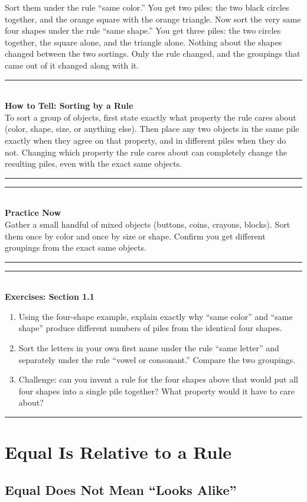 \documentclass[11pt]{book}
\newenvironment{algorithmproc}[1]{\vspace{0.6em}\noindent\rule{\linewidth}{0.6pt}\\[0.2em]\textbf{How to Tell: #1}\\[0.3em]}{\\[0.2em]\noindent\rule{\linewidth}{0.6pt}\vspace{0.6em}}
\newenvironment{practicenow}{\vspace{0.6em}\noindent\rule{\linewidth}{0.6pt}\\[0.2em]\textbf{Practice Now}\\[0.3em]}{\\[0.2em]\noindent\rule{\linewidth}{0.6pt}\vspace{0.6em}}
\newenvironment{exercisebox}[1]{\vspace{0.8em}\noindent\rule{\linewidth}{0.6pt}\\[0.2em]\textbf{Exercises: #1}\\[0.3em]\begin{enumerate}[label=\arabic*., itemsep=0.4em]}{\end{enumerate}\noindent\rule{\linewidth}{0.6pt}\vspace{0.6em}}
\begin{document}
Sort them under the rule ``same color.'' You get two piles: the two black circles together, and the orange square with the orange triangle. Now sort the very same four shapes under the rule ``same shape.'' You get three piles: the two circles together, the square alone, and the triangle alone. Nothing about the shapes changed between the two sortings. Only the rule changed, and the groupings that came out of it changed along with it.

\begin{algorithmproc}{Sorting by a Rule}
To sort a group of objects, first state exactly what property the rule cares about (color, shape, size, or anything else). Then place any two objects in the same pile exactly when they agree on that property, and in different piles when they do not. Changing which property the rule cares about can completely change the resulting piles, even with the exact same objects.
\end{algorithmproc}

\begin{practicenow}
Gather a small handful of mixed objects (buttons, coins, crayons, blocks). Sort them once by color and once by size or shape. Confirm you get different groupings from the exact same objects.
\end{practicenow}

\begin{exercisebox}{Section 1.1}
\item Using the four-shape example, explain exactly why ``same color'' and ``same shape'' produce different numbers of piles from the identical four shapes.
\item Sort the letters in your own first name under the rule ``same letter'' and separately under the rule ``vowel or consonant.'' Compare the two groupings.
\item Challenge: can you invent a rule for the four shapes above that would put all four shapes into a single pile together? What property would it have to care about?
\end{exercisebox}

\chapter{Equal Is Relative to a Rule}

\section{Equal Does Not Mean ``Looks Alike''}
\end{document}
